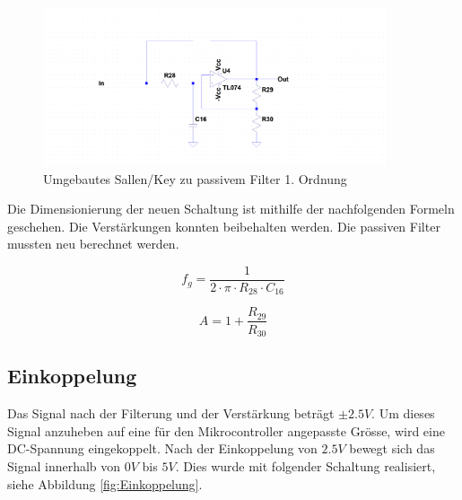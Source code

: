 \begin{figure}[H]
\begin{center}
\includegraphics[width=0.9\textwidth]{images/Analoge_Schaltung_Sallentopassive.png}
\caption{Umgebautes Sallen/Key zu passivem Filter 1. Ordnung}
\end{center}
\end{figure}

Die Dimensionierung der neuen Schaltung ist mithilfe der nachfolgenden Formeln geschehen. Die Verstärkungen konnten beibehalten werden. Die passiven Filter mussten neu berechnet werden.\cite{wiki}

\begin{equation}
f_g=\frac{1}{2 \cdot \pi \cdot R_{28} \cdot C_{16}}
\label{eq:Grenzfrequenz}
\end{equation}

\begin{equation}
A=1+\frac{R_{29}}{R_{30}}
\label{eq:Verstärkung}
\end{equation}

\subsection{Einkoppelung}
Das Signal nach der Filterung und der Verstärkung beträgt $\pm 2.5V$. Um dieses Signal anzuheben auf eine für den Mikrocontroller angepasste Grösse, wird eine DC-Spannung eingekoppelt. Nach der Einkoppelung von $2.5V$ bewegt sich das Signal innerhalb von $0V$ bis $5V$. Dies wurde mit folgender Schaltung realisiert, siehe Abbildung \ref{fig:Einkoppelung}.


